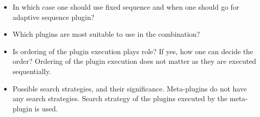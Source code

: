 
\begin{itemize}
	\item In which case one should use fixed sequence and when one should go for adaptive sequence plugin?
	\item Which plugins are most suitable to use in the combination?
	\item Is ordering of the plugin execution plays role? If yes, how one can decide the order?
	Ordering of the plugin execution does not matter as they are executed sequentially. 
	
	\item Possible search strategies, and their significance.
	Meta-plugins do not have any search strategies. Search strategy of the plugins executed by the meta-plugin is used.
\end{itemize}